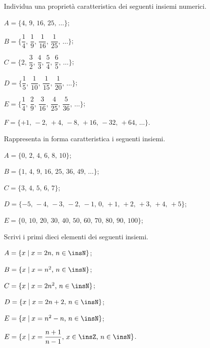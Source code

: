 \begin{esercizio}[\Ast]
Individua una proprietà caratteristica dei seguenti insiemi numerici.
\label{ese:5.28}
\begin{enumeratea}
\spazielenx
 \item $A=\{\text{4, 9, 16, 25, \ldots}\}$;
 \item $B=\bigg\{\dfrac{1}{4}\text{, }\dfrac{1}{9}\text{, }\dfrac{1}{16}\text{, }\dfrac{1}{25}\text{, }\ldots\bigg\}$;
 \item $C=\bigg\{2\text{, }\dfrac{3}{2}\text{, }\dfrac{4}{3}\text{, }\dfrac{5}{4}\text{, }\dfrac{6}{5}\text{, }\ldots\bigg\}$;
 \item $D=\bigg\{\dfrac{1}{5}\text{, }\dfrac{1}{10}\text{, }\dfrac{1}{15}\text{, }\dfrac{1}{20}\text{, }\ldots\bigg\}$;
 \item $E=\bigg\{\dfrac{1}{4}\text{, }\dfrac{2}{9}\text{, }\dfrac{3}{16}\text{, }\dfrac{4}{25}\text{, }\dfrac{5}{36}\text{, }\ldots\bigg\}$;
 \item $F=\{+1\text{, }-2\text{, }+4\text{, }-8\text{, }+16\text{, }-32\text{, }+64\text{, }\ldots\}$.
 \end{enumeratea}
\end{esercizio}
\begin{esercizio}
\label{ese:5.29}
Rappresenta in forma caratteristica i seguenti insiemi.
\begin{enumeratea}
\item $A=\{\text{0, 2, 4, 6, 8, 10}\}$;
\item $B=\{\text{1, 4, 9, 16, 25, 36, 49, \ldots}\}$;
\item $C=\{\text{3, 4, 5, 6, 7}\}$;
\item $D=\{-5\text{, }-4\text{, }-3\text{, }-2\text{, }-1\text{, }0\text{, }+1\text{, }+2\text{, }+3\text{, }+4\text{, }+5\}$;
\item $E=\{\text{0, 10, 20, 30, 40, 50, 60, 70, 80, 90, 100}\}$;
\end{enumeratea}
\end{esercizio}

\begin{esercizio}
\label{ese:5.30}
Scrivi i primi dieci elementi dei seguenti insiemi.
\begin{enumeratea}
\spazielenx
\item $A=\{x\mid x=2n\text{, }n\in\insN\}$;
\item $B=\{x\mid x=n^{2}\text{, }n\in\insN\}$;
\item $C=\{x\mid x=2n^{2}\text{, }n\in\insN\}$;
\item $D=\{x\mid x=2n+2\text{, }n\in\insN\}$;
\item $E=\{x\mid x=n^{2}-n\text{, }n\in\insN\}$;
\item $E=\{x\mid x=\dfrac{n+1}{n-1}\text{, }x\in\insZ\text{, }n\in\insN\}$.
\end{enumeratea}
\end{esercizio}

